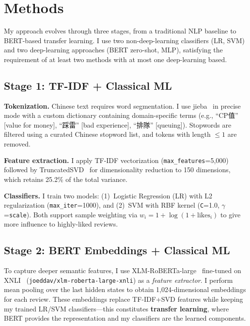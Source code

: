 \documentclass[12pt]{article}
\begin{document}
\section{Methods}

My approach evolves through three stages, from a traditional NLP baseline to BERT-based transfer learning.
I use two non-deep-learning classifiers (LR, SVM) and two deep-learning approaches (BERT zero-shot, MLP), satisfying the requirement of at least two methods with at most one deep-learning based.

\subsection{Stage 1: TF-IDF + Classical ML}

\textbf{Tokenization.}
Chinese text requires word segmentation.
I use jieba~\citep{jieba} in precise mode with a custom dictionary containing domain-specific terms (e.g., ``CP值'' [value for money], ``踩雷'' [bad experience], ``排隊'' [queuing]).
Stopwords are filtered using a curated Chinese stopword list, and tokens with length $\leq 1$ are removed.

\textbf{Feature extraction.}
I apply TF-IDF vectorization (\texttt{max\_features}=5{,}000) followed by TruncatedSVD~\citep{halko2011svd} for dimensionality reduction to 150 dimensions, which retains 25.2\% of the total variance.

\textbf{Classifiers.}
I train two models: (1)~Logistic Regression (LR) with L2 regularization (\texttt{max\_iter}=1000), and (2)~SVM with RBF kernel (\texttt{C}=1.0, $\gamma$=\texttt{scale}).
Both support sample weighting via $w_i = 1 + \log(1 + \text{likes}_i)$ to give more influence to highly-liked reviews.

\subsection{Stage 2: BERT Embeddings + Classical ML}

To capture deeper semantic features, I use XLM-RoBERTa-large~\citep{conneau2020xlmr} fine-tuned on XNLI~\citep{conneau2018xnli} (\texttt{joeddav/xlm-roberta-large-xnli}) as a \textit{feature extractor}.
I perform mean pooling over the last hidden states to obtain 1{,}024-dimensional embeddings for each review.
These embeddings replace TF-IDF+SVD features while keeping my trained LR/SVM classifiers---this constitutes \textbf{transfer learning}, where BERT provides the representation and my classifiers are the learned components.
\end{document}
